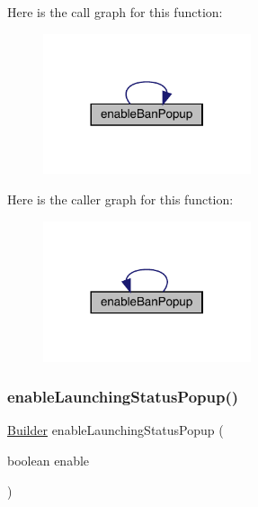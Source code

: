 Here is the call graph for this function\+:
\nopagebreak
\begin{figure}[H]
\begin{center}
\leavevmode
\includegraphics[width=173pt]{classcom_1_1toast_1_1android_1_1gamebase_1_1_gamebase_configuration_1_1_builder_a92e099b86ad7acbabec3c0c4b7bda36e_cgraph}
\end{center}
\end{figure}
Here is the caller graph for this function\+:
\nopagebreak
\begin{figure}[H]
\begin{center}
\leavevmode
\includegraphics[width=173pt]{classcom_1_1toast_1_1android_1_1gamebase_1_1_gamebase_configuration_1_1_builder_a92e099b86ad7acbabec3c0c4b7bda36e_icgraph}
\end{center}
\end{figure}
\mbox{\label{classcom_1_1toast_1_1android_1_1gamebase_1_1_gamebase_configuration_1_1_builder_a1012d5b14ba4676c15432cc45fd26488}} 
\subsubsection{\texorpdfstring{enable\+Launching\+Status\+Popup()}{enableLaunchingStatusPopup()}}
{\footnotesize\ttfamily \hyperlink{classcom_1_1toast_1_1android_1_1gamebase_1_1_gamebase_configuration_1_1_builder}{Builder} enable\+Launching\+Status\+Popup (\begin{DoxyParamCaption}\item[{boolean}]{enable }\end{DoxyParamCaption})}

